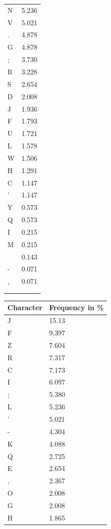 \documentclass{uva-inf-presentation}
\begin{document}
\begin{frame}[containsverbatim]
\begin{minipage}{0.2\linewidth}
{\begin{tabular}{ll}
N & 5.236 \\
V & 5.021 \\
. & 4.878 \\
G & 4.878 \\
; & 3.730 \\
R & 3.228 \\
S & 2.654 \\
D & 2.008 \\
J & 1.936 \\
F & 1.793 \\
U & 1.721 \\
L & 1.578 \\
W & 1.506 \\
H & 1.291 \\
C & 1.147 \\
' & 1.147 \\
Y & 0.573 \\
Q & 0.573 \\
I & 0.215 \\
M & 0.215 \\
  & 0.143 \\
- & 0.071 \\
, & 0.071 \\
  &       \\ 
  &       \\ \bottomrule
\end{tabular}}
\end{minipage}%
\begin{minipage}{0.2\linewidth}
\centering
{\fontsize{3.5pt}{4.5pt}\selectfont
\begin{tabular}{ll}\toprule
Character & Frequency in \%     \\
\midrule
J & 15.13 \\
F & 9.397 \\
Z & 7.604 \\
R & 7.317 \\
C & 7.173 \\
I & 6.097 \\
; & 5.380 \\
L & 5.236 \\
' & 5.021 \\
- & 4.304 \\
K & 4.088 \\
Q & 2.725 \\
E & 2.654 \\
, & 2.367 \\
O & 2.008 \\
G & 2.008 \\
H & 1.865 \\

\end{tabular}}
\end{minipage}
\end{frame}
\end{document}
